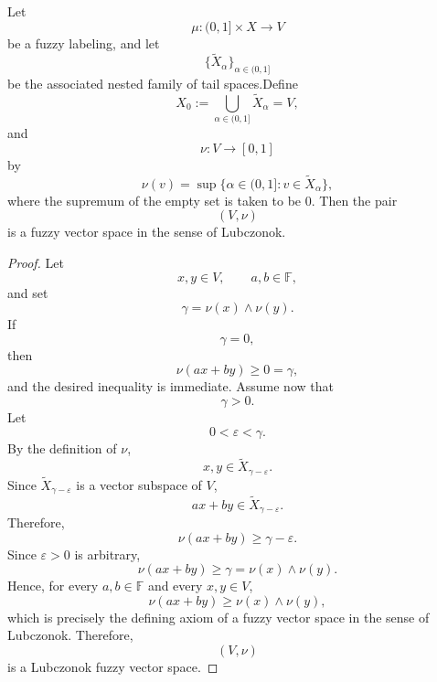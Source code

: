 \documentclass[10pt,a4paper]{amsart}
\begin{document}
\begin{theorem}
	\label{thm:canonical-induction}
	Let
	\[
	\mu:(0,1]\times X\longrightarrow V
	\]
	be a fuzzy labeling, and let
	\[
	\{\widetilde X_\alpha\}_{\alpha\in(0,1]}
	\]
	be the associated nested family of tail spaces.Define
		\[
	X_0:=
	\bigcup_{\alpha\in(0,1]}
	\widetilde X_\alpha
	=
	V,
	\]
	and
	\[
	\nu:V\longrightarrow[0,1]
	\]
	by
	\[
	\nu(v)
	=
	\sup\{\alpha\in(0,1]:v\in\widetilde X_\alpha\},
	\]
	where the supremum of the empty set is taken to be \(0\).
	Then the pair
	\[
	(V,\nu)
	\]
	is a fuzzy vector space in the sense of Lubczonok.
\end{theorem}

\begin{proof}
	
Let
	\[
	x,y\in V,
	\qquad
	a,b\in\mathbb F,
	\]
	and set
	\[
	\gamma
	=
	\nu(x)\wedge\nu(y).
	\]
	If
	\[
	\gamma=0,
	\]
	then
	\[
	\nu(ax+by)\ge0=\gamma,
	\]
	and the desired inequality is immediate.
	Assume now that
	\[
	\gamma>0.
	\]
	Let
	\[
	0<\varepsilon<\gamma.
	\]
	By the definition of \(\nu\),
	\[
	x,y\in
	\widetilde X_{\gamma-\varepsilon}.
	\]
	Since
	\(
	\widetilde X_{\gamma-\varepsilon}
	\)
	is a vector subspace of \(V\),
	\[
	ax+by
	\in
	\widetilde X_{\gamma-\varepsilon}.
	\]
	Therefore,
	\[
	\nu(ax+by)
	\ge
	\gamma-\varepsilon.
	\]
	Since \(\varepsilon>0\) is arbitrary,
	\[
	\nu(ax+by)
	\ge
	\gamma
	=
	\nu(x)\wedge\nu(y).
	\]
	Hence, for every
	\(a,b\in\mathbb F\) and every
	\(x,y\in V\),
	\[
	\nu(ax+by)
	\ge
	\nu(x)\wedge\nu(y),
	\]
	which is precisely the defining axiom of a fuzzy vector space in the sense
	of Lubczonok.
	Therefore,
	\[
	(V,\nu)
	\]
	is a Lubczonok fuzzy vector space.
	
\end{proof}
\end{document}
